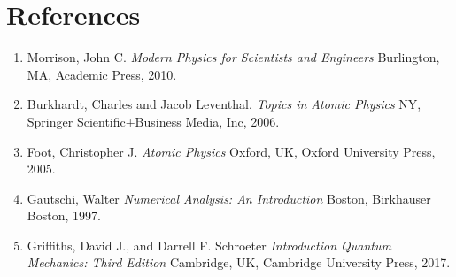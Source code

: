 \documentclass{article}
\begin{document}
\section{References}

\begin{enumerate}
\item Morrison, John C. \textit{Modern Physics for Scientists and Engineers} Burlington, MA, Academic Press, 2010.

\item Burkhardt, Charles and Jacob Leventhal. \textit{Topics in Atomic Physics} NY, Springer Scientific+Business Media, Inc, 2006.

\item Foot, Christopher J. \textit{Atomic Physics} Oxford, UK, Oxford University Press, 2005.

\item Gautschi, Walter \textit{Numerical Analysis: An Introduction} Boston, Birkhauser Boston, 1997.

\item Griffiths, David J., and Darrell F. Schroeter \textit{Introduction Quantum Mechanics: Third Edition} Cambridge, UK, Cambridge University Press, 2017.

\end{enumerate}
\end{document}

